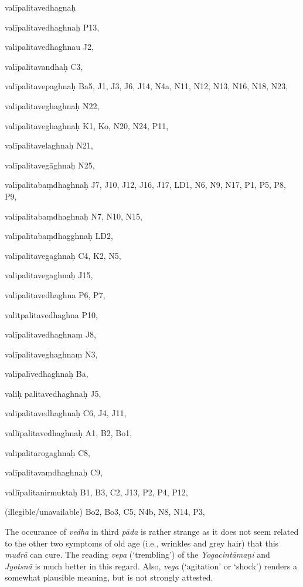 \begin{marma}[hp02_028]
  \begin{description}
    \end{description}  

\end{marma}
  
\begin{marma}[hp03_029]


\item[valīpalitavedhagnaḥ]
\item[valīpalitavedhaghnaḥ] P13,
\item[valipalitavedhaghnau] J2,
\item[valīpalitavandhaḥ] C3, 
\item[valīpalitavepaghnaḥ] Ba5, J1, J3, J6, J14, N4a, N11, N12, N13, N16, N18, N23, 
\item[valipalitaveghaghnaḥ] N22,
\item[valīpalitaveghaghnaḥ] K1, Ko, N20, N24, P11, 
\item[valīpalitavelaghnaḥ] N21,
\item[valīpalitavegāghnaḥ] N25,
\item[valīpalitabaṃdhaghnaḥ] J7, J10, J12, J16, J17, LD1, N6, N9, N17, P1, P5, P8, P9, 
\item[valipalitabaṃdhaghnaḥ] N7, N10, N15, 
\item[valīpalītabaṃdhagghnaḥ] LD2,
\item[valīpalitavegaghnaḥ] C4, K2, N5,  
\item[valipalitavegaghnaḥ] J15,
\item[valipalitavedhaghna] P6, P7,
\item[valītpalitavedhaghna] P10,
\item[valīpalitavedhaghnaṃ] J8,
\item[valīpalitaveghaghnaṃ] N3,
\item[valīpalīvedhaghnaḥ] Ba,
\item[valiḥ palitavedhaghnaḥ] J5,
\item[valīpalitavedhaghnaḥ] C6, J4, J11, 
\item[vallīpalitavedhaghnaḥ] A1, B2, Bo1, 
\item[valīpalitarogaghnaḥ] C8,
\item[valīpalitavaṃdhaghnaḥ] C9,
\item[vallīpalitanirmuktaḥ] B1, B3, C2, J13, P2, P4, P12, 
  \item[(illegible/unavailable)] Bo2, Bo3, C5, N4b, N8, N14, P3,

    \begin{description}
 The occurance of \emph{vedha} in third \emph{pāda} is rather strange as it does not seem related to the other two symptoms of old age (i.e., wrinkles and grey hair) that this \emph{mudrā} can cure. The reading \emph{vepa} (`trembling') of the \emph{Yogacintāmaṇi} and \emph{Jyotsnā} is much better in this regard. Also, \emph{vega} (`agitation' or `shock') renders a somewhat plausible meaning, but is not strongly attested.      
    \end{description}

  \end{marma}

